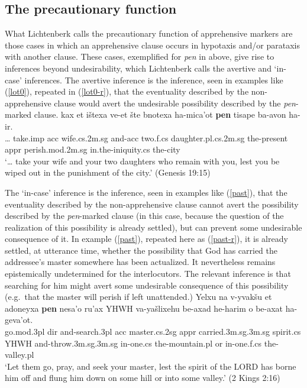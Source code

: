 \documentclass[output=paper,colorlinks,citecolor=brown]{langscibook}
\begin{document}
\subsection{The precautionary function}
\label{subsec:precautionary}
What Lichtenberk calls the precautionary function of apprehensive markers are those cases in which an apprehensive clause occurs in hypotaxis and/or parataxis with another clause. These cases, exemplified for \textit{pen} in  above, give rise to inferences beyond undesirability, which Lichtenberk calls the avertive and `in-case' inferences. The avertive inference is the inference, seen in examples like  (\ref{lot0}), repeated in (\ref{lot0-r}), that the eventuality described by the non-apprehensive clause would avert the undesirable possibility described by the \textit{pen}-marked clause.
\ea
\label{lot0-r} 
\gll {\ldots} kax et ištexa ve-et šte bnotexa ha-mica'ot \textbf{pen} tisape ba-avon ha-ir. \\
{\ldots}  take.{\sc imp} {\sc acc} wife.{\sc cs}.2{\sc m.sg} and-{\sc acc} two.{\sc f.cs} daughter.{\sc pl.cs}.{\sc 2m.sg} the-present {\sc appr} perish.{\sc mod.2m.sg} in.the-iniquity.{\sc cs} the-city \\

\glt  `{\ldots} take your wife and your two daughters who remain with you, lest you be wiped out in the punishment of the city.' (Genesis 19:15)
\z


The `in-case' inference is the inference, seen in examples like (\ref{past}), that the eventuality described by the non-apprehensive clause cannot avert the possibility described by the \textit{pen}-marked clause (in this case, because the question of the realization of this possibility is already settled), but can prevent some undesirable consequence of it. In example (\ref{past}), repeated here as (\ref{past-r}), it is already settled, at utterance time, whether the possibility that God has carried the addressee's master somewhere has been actualized. It nevertheless remains epistemically undetermined for the interlocutors. The relevant inference is that searching for him might avert some undesirable consequence of this possibility (e.g.\ that the master will perish if left unattended.)
\ea
\label{past-r} 
\gll Yelxu na v-yvakšu et adoneyxa  \textbf{pen} nesa'o ru'ax YHWH va-yašlixehu be-axad he-harim o be-axat ha-geva'ot. \\
go.{\sc mod.3pl} {\sc dir} and-search.{\sc 3pl} {\sc acc} master.{\sc cs}.{\sc 2sg} {\sc appr} carried.{\sc 3m.sg}.{\sc 3m.sg} spirit.{\sc cs} YHWH and-throw.{\sc 3m.sg.3m.sg} in-one.{\sc cs} the-mountain.{\sc pl} or in-one.{\sc f.cs} the-valley.{\sc pl} \\
\glt `Let them go, pray, and seek your master, lest the spirit of the LORD has borne him off and flung him down on some hill or into some valley.'  (2 Kings 2:16)
\z
\end{document}
